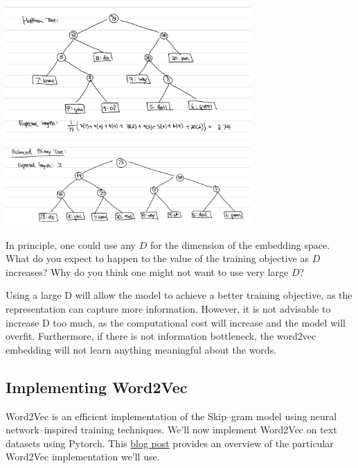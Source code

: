 \begin{solution}
	\begin{center}
		\includegraphics[width=0.7\textwidth]{huffman.jpeg}
		\includegraphics[width=0.7\textwidth]{binary.jpeg}
	\end{center}

\end{solution}


\problem[3]
In principle, one could use any $D$ for the dimension of the embedding space.  What do you expect to happen to the value of the training objective as $D$ increases?  Why do you think one might not want to use very large $D$?

\begin{solution}
	Using a large D will allow the model to achieve a better training objective, as the representation can capture more information. However, it is not advisable to increase D too much, as the computational cost will increase and the model will overfit. Furthermore, if there is not information bottleneck, the word2vec embedding will not learn anything meaningful about the words.
\end{solution}

\subsection{Implementing Word2Vec}
Word2Vec is an efficient implementation of the Skip--gram model using neural network--inspired training techniques. We'll now implement Word2Vec on text datasets using Pytorch.  This  
\href{http://mccormickml.com/2016/04/19/word2vec-tutorial-the-skip-gram-model/}{blog post} provides an overview of the particular Word2Vec implementation we'll use.

